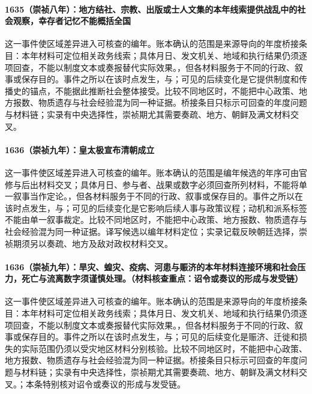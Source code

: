 \paragraph{1635（崇祯八年）：地方结社、宗教、出版或士人文集的本年线索提供战乱中的社会观察，幸存者记忆不能概括全国} 这一事件使区域差异进入可核查的编年。账本确认的范围是来源导向的年度桥接条目：本年材料可定位相关政务线索；具体月日、发文机关、地域和执行结果仍须逐项回查，不能以制度文本或奏报替代实际效果。，但各材料服务于不同的行政、叙事或保存目的。事件之所以在该时点发生，与；可见的后续变化是它提供制度和传播史的锚点，不能据此推断社会整体接受。比较不同地区时，不能把中心政策、地方报数、物质遗存与社会经验混为同一种证据。桥接条目只标示可回查的年度问题与材料链；实录有中央选择性，崇祯期尤其需要奏疏、地方、朝鲜及满文材料交叉。

\paragraph{1636（崇祯九年）：皇太极宣布清朝成立} 这一事件使区域差异进入可核查的编年。账本确认的范围是编年候选的年序可由官修与后出材料交叉；具体月日、参与者、战果或数字必须回查所列材料，不能将单一叙事当作定论。，但各材料服务于不同的行政、叙事或保存目的。事件之所以在该时点发生，与；可见的后续变化是它影响后续人事与政策议程；动机和派系标签不能由单一叙事裁定。比较不同地区时，不能把中心政策、地方报数、物质遗存与社会经验混为同一种证据。译写候选以编年材料定位；实录记载反映朝廷选择，崇祯期须另以奏疏、地方及敌对政权材料交叉。

\paragraph{1636（崇祯九年）：旱灾、蝗灾、疫病、河患与赈济的本年材料连接环境和社会压力，死亡与流离数字须谨慎处理。（材料核查重点：诏令或奏议的形成与发受链）} 这一事件使区域差异进入可核查的编年。账本确认的范围是来源导向的年度桥接条目：本年材料可定位相关政务线索；具体月日、发文机关、地域和执行结果仍须逐项回查，不能以制度文本或奏报替代实际效果。，但各材料服务于不同的行政、叙事或保存目的。事件之所以在该时点发生，与；可见的后续变化是赈济、迁徙和损失的实际范围仍须以受灾地区材料分别核验。比较不同地区时，不能把中心政策、地方报数、物质遗存与社会经验混为同一种证据。桥接条目只标示可回查的年度问题与材料链；实录有中央选择性，崇祯期尤其需要奏疏、地方、朝鲜及满文材料交叉。；本条特别核对诏令或奏议的形成与发受链。

